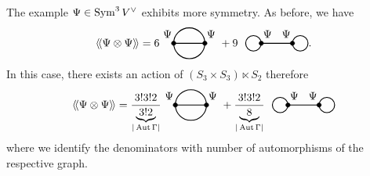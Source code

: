 \begin{example}
  The example $\Psi \in \operatorname{Sym}^3 V^\vee$ exhibits more symmetry. As before, we have
  \begin{equation*}
    \avg{\Psi \otimes \Psi}
    = 6
    \begin{tikzpicture}[baseline=-1mm]
      \draw[thick] (0, 0) node at (-0.2, 0.3) {$\Psi$} -- (1, 0) node at (1.2, 0.3) {$\Psi$};
      \draw[thick] (0, 0) arc (180:0:.5);
      \draw[thick] (0, 0) arc (-180:0:.5);
      \draw[fill=black] (0, 0) circle (2pt);
      \draw[fill=black] (1, 0) circle (2pt);
    \end{tikzpicture}
    + 9 \ \
    \begin{tikzpicture}[baseline=-1mm]
      \draw[thick] (0, 0) node at (0.2, 0.3) {$\Psi$} -- (1, 0) node at (0.8, .3) {$\Psi$};
      \draw[thick] (-.25, 0) circle (2.5mm);
      \draw[thick] (1.25, 0) circle (2.5mm);
      \draw[fill=black] (0, 0) circle (2pt);
      \draw[fill=black] (1, 0) circle (2pt);
    \end{tikzpicture}.
  \end{equation*}
  In this case, there exists an action of $(S_3 \times S_3) \ltimes S_2$ therefore
  \begin{equation*}
    \avg{\Psi \otimes \Psi}
    = \frac{3! 3! 2}{\underbrace{3! 2}_{| \Aut \Gamma |}}
    \begin{tikzpicture}[baseline=-1mm]
      \draw[thick] (0, 0) node at (-0.2, 0.3) {$\Psi$} -- (1, 0) node at (1.2, 0.3) {$\Psi$};
      \draw[thick] (0, 0) arc (180:0:.5);
      \draw[thick] (0, 0) arc (-180:0:.5);
      \draw[fill=black] (0, 0) circle (2pt);
      \draw[fill=black] (1, 0) circle (2pt);
    \end{tikzpicture}
    + \frac{3! 3! 2}{\underbrace{8}_{|\Aut \Gamma|}} \ \
    \begin{tikzpicture}[baseline=-1mm]
      \draw[thick] (0, 0) node at (0.2, 0.3) {$\Psi$} -- (1, 0) node at (0.8, .3) {$\Psi$};
      \draw[thick] (-.25, 0) circle (2.5mm);
      \draw[thick] (1.25, 0) circle (2.5mm);
      \draw[fill=black] (0, 0) circle (2pt);
      \draw[fill=black] (1, 0) circle (2pt);
    \end{tikzpicture}
  \end{equation*}
  where we identify the denominators with number of automorphisms of the respective graph.
\end{example}
